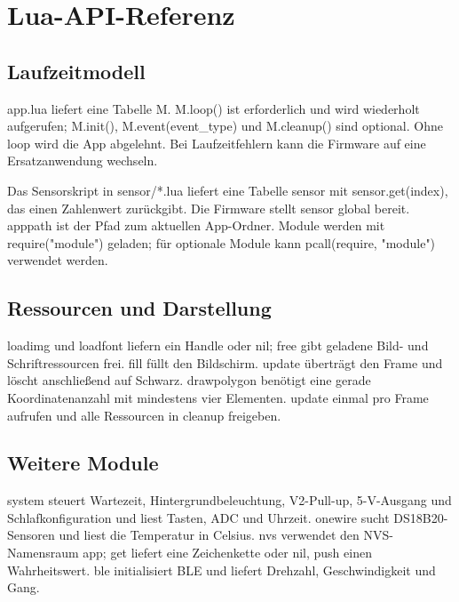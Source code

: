 \chapter{Lua-API-Referenz}
\section{Laufzeitmodell}
app.lua liefert eine Tabelle M. M.loop() ist erforderlich und wird wiederholt aufgerufen; M.init(), M.event(event\_type) und M.cleanup() sind optional. Ohne loop wird die App abgelehnt. Bei Laufzeitfehlern kann die Firmware auf eine Ersatzanwendung wechseln.

Das Sensorskript in sensor/*.lua liefert eine Tabelle sensor mit sensor.get(index), das einen Zahlenwert zurückgibt. Die Firmware stellt sensor global bereit. apppath ist der Pfad zum aktuellen App-Ordner. Module werden mit require("module") geladen; für optionale Module kann pcall(require, "module") verwendet werden.
\section{Ressourcen und Darstellung}
loadimg und loadfont liefern ein Handle oder nil; free gibt geladene Bild- und Schriftressourcen frei. fill füllt den Bildschirm. update überträgt den Frame und löscht anschließend auf Schwarz. drawpolygon benötigt eine gerade Koordinatenanzahl mit mindestens vier Elementen. update einmal pro Frame aufrufen und alle Ressourcen in cleanup freigeben.
\section{Weitere Module}
system steuert Wartezeit, Hintergrundbeleuchtung, V2-Pull-up, 5-V-Ausgang und Schlafkonfiguration und liest Tasten, ADC und Uhrzeit. onewire sucht DS18B20-Sensoren und liest die Temperatur in Celsius. nvs verwendet den NVS-Namensraum app; get liefert eine Zeichenkette oder nil, push einen Wahrheitswert. ble initialisiert BLE und liefert Drehzahl, Geschwindigkeit und Gang.
